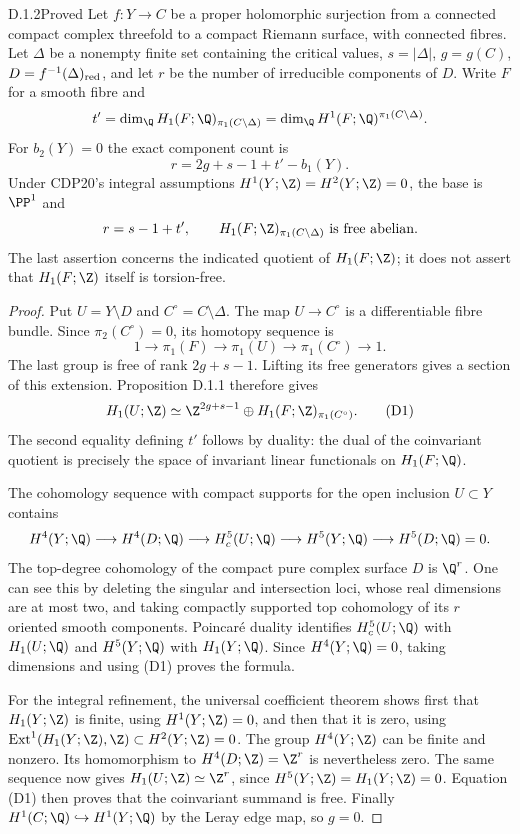 \begin{idstatement}{D.1.2}{Proved}\label{st:D.1.2}
Let $f:Y\to C$ be a proper holomorphic surjection from a connected
compact complex threefold to a compact Riemann surface, with
connected fibres. Let $\Delta$ be a nonempty finite set containing
the critical values, $s=|\Delta|$, $g=g(C)$,
$D=f^{-1}(\Delta)_{\rm red}$, and let $r$ be the number of
irreducible components of $D$. Write $F$ for a smooth fibre and
\[
t'=\dim_{\Q}H_1(F;\Q)_{\pi_1(C\setminus\Delta)}
   =\dim_{\Q}H^1(F;\Q)^{\pi_1(C\setminus\Delta)}.
\]
For $b_2(Y)=0$ the exact component count is
\[
\boxed{\quad r=2g+s-1+t'-b_1(Y).\quad}
\]
Under CDP20's integral assumptions
$H^1(Y;\Z)=H^2(Y;\Z)=0$, the base is $\PP^1$ and
\[
r=s-1+t',\qquad
H_1(F;\Z)_{\pi_1(C\setminus\Delta)}\text{ is free abelian}.
\]
The last assertion concerns the indicated quotient of $H_1(F;\Z)$;
it does not assert that $H_1(F;\Z)$ itself is torsion-free.
\end{idstatement}
\begin{proof}
Put $U=Y\setminus D$ and $C^\circ=C\setminus\Delta$.
The map $U\to C^\circ$ is a differentiable fibre bundle. Since
$\pi_2(C^\circ)=0$, its homotopy sequence is
\[
1\longrightarrow\pi_1(F)\longrightarrow\pi_1(U)
 \longrightarrow\pi_1(C^\circ)\longrightarrow1.
\]
The last group is free of rank $2g+s-1$. Lifting its free generators
gives a section of this extension. Proposition D.1.1 therefore gives
\[
H_1(U;\Z)\simeq
\Z^{2g+s-1}\oplus H_1(F;\Z)_{\pi_1(C^\circ)}.       \tag{D1}
\]
The second equality defining $t'$ follows by duality: the dual of
the coinvariant quotient is precisely the space of invariant
linear functionals on $H_1(F;\Q)$.

The cohomology sequence with compact supports for the open inclusion
$U\subset Y$ contains
\[
H^4(Y;\Q)\longrightarrow H^4(D;\Q)
\longrightarrow H_c^5(U;\Q)
\longrightarrow H^5(Y;\Q)\longrightarrow H^5(D;\Q)=0.
\]
The top-degree cohomology of the compact pure complex surface $D$
is $\Q^r$. One can see this by deleting the singular and intersection
loci, whose real dimensions are at most two, and taking compactly
supported top cohomology of its $r$ oriented smooth components.
Poincar\'e duality identifies $H_c^5(U;\Q)$ with $H_1(U;\Q)$ and
$H^5(Y;\Q)$ with $H_1(Y;\Q)$. Since $H^4(Y;\Q)=0$, taking
dimensions and using (D1) proves the formula.

For the integral refinement, the universal coefficient theorem shows
first that $H_1(Y;\Z)$ is finite, using $H^1(Y;\Z)=0$, and then that
it is zero, using
$\operatorname{Ext}^1(H_1(Y;\Z),\Z)\subset H^2(Y;\Z)=0$.
The group $H^4(Y;\Z)$ can be finite and nonzero. Its homomorphism
to $H^4(D;\Z)=\Z^r$ is nevertheless zero. The same sequence now
gives $H_1(U;\Z)\simeq\Z^r$, since $H^5(Y;\Z)=H_1(Y;\Z)=0$.
Equation (D1) then proves that the coinvariant summand is free.
Finally $H^1(C;\Q)\hookrightarrow H^1(Y;\Q)$ by the Leray edge
map, so $g=0$.
\end{proof}


